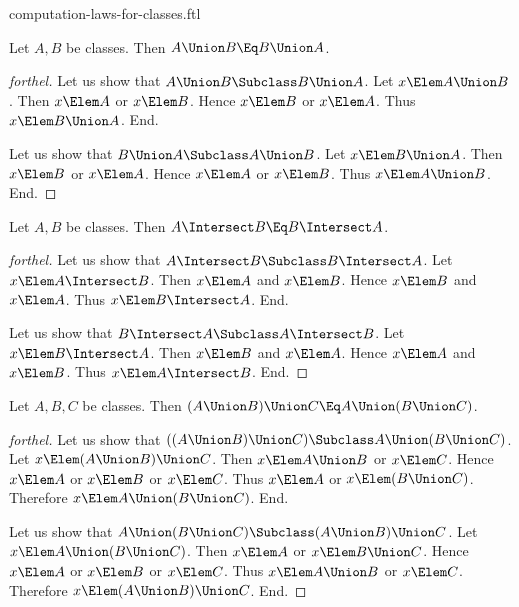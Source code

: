 \documentclass{stex}
\begin{document}
\begin{smodule}{computation-laws-for-classes.ftl}


\begin{proposition*}[forthel]
  Let $A, B$ be classes.
  Then $A \Union B \Eq B \Union A$.
\end{proposition*}
\begin{proof}[forthel]
  Let us show that $A \Union B \Subclass B \Union A$.
    Let $x \Elem A \Union B$.
    Then $x \Elem A$ or $x \Elem B$.
    Hence $x \Elem B$ or $x \Elem A$.
    Thus $x \Elem B \Union A$.
  End.

  Let us show that $B \Union A \Subclass A \Union B$.
    Let $x \Elem B \Union A$.
    Then $x \Elem B$ or $x \Elem A$.
    Hence $x \Elem A$ or $x \Elem B$.
    Thus $x \Elem A \Union B$.
  End.
\end{proof}

\begin{proposition*}[forthel]
  Let $A, B$ be classes.
  Then $A \Intersect B \Eq B \Intersect A$.
\end{proposition*}
\begin{proof}[forthel]
  Let us show that $A \Intersect B \Subclass B \Intersect A$.
    Let $x \Elem A \Intersect B$.
    Then $x \Elem A$ and $x \Elem B$.
    Hence $x \Elem B$ and $x \Elem A$.
    Thus $x \Elem B \Intersect A$.
  End.

  Let us show that $B \Intersect A \Subclass A \Intersect B$.
    Let $x \Elem B \Intersect A$.
    Then $x \Elem B$ and $x \Elem A$.
    Hence $x \Elem A$ and $x \Elem B$.
    Thus $x \Elem A \Intersect B$.
  End.
\end{proof}

\begin{proposition*}[forthel]
  Let $A, B, C$ be classes.
  Then $(A \Union B) \Union C \Eq A \Union (B \Union C)$.
\end{proposition*}
\begin{proof}[forthel]
  Let us show that $((A \Union B) \Union C) \Subclass A \Union (B \Union C)$. %
    Let $x \Elem (A \Union B) \Union C$.
    Then $x \Elem A \Union B$ or $x \Elem C$.
    Hence $x \Elem A$ or $x \Elem B$ or $x \Elem C$.
    Thus $x \Elem A$ or $x \Elem (B \Union C)$.
    Therefore $x \Elem A \Union (B \Union C)$.
  End.

  Let us show that $A \Union (B \Union C) \Subclass (A \Union B) \Union C$.
    Let $x \Elem A \Union (B \Union C)$.
    Then $x \Elem A$ or $x \Elem B \Union C$.
    Hence $x \Elem A$ or $x \Elem B$ or $x \Elem C$.
    Thus $x \Elem A \Union B$ or $x \Elem C$.
    Therefore $x \Elem (A \Union B) \Union C$.
  End.
\end{proof}


\end{smodule}
\end{document}

